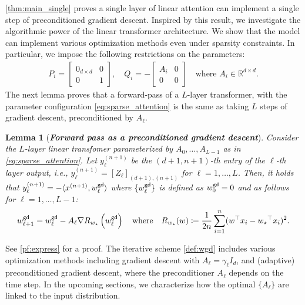 \documentclass{article}
\newcommand{\R}{\mathbb{R}}
\newtheorem{lemma}{Lemma}
\newcommand{\wstar}{w_\star}
\newcommand{\tx}[1]{x^{(#1)}}
\newcommand{\ty}[1]{y^{(#1)}}
\newcommand{\emphh}[1]{\textbf{\emph{#1}}}
\newcommand{\wgd}{w^{\sf gd}}
\newcommand*\lrp[1]{\left( #1 \right)}
\begin{document}
\autoref{thm:main_single} proves a single layer of linear attention can implement a single step of preconditioned gradient descent. Inspired by this result, we investigate the algorithmic power of the linear transformer architecture. We show that the model can implement various optimization methods even under sparsity constraints. In particular, we impose the following restrictions on the parameters:
\begin{align}\label{eq:sparse_attention}
P_i = \begin{bmatrix}
0_{d\times d} & 0 \\ 
0 & 1 
\end{bmatrix}, \quad Q_i = -  \begin{bmatrix}
A_i & 0 \\ 
0 & 0
\end{bmatrix} \quad \text{where $A_i \in \R^{d\times d}$.}
\end{align}
The next lemma proves that a forward-pass of a $L$-layer transformer, with the parameter configuration \eqref{eq:sparse_attention} is the same as taking $L$ steps of gradient descent, preconditioned by $A_\ell$.

  

\begin{lemma}[\emphh{Forward pass as a preconditioned gradient descent}] 
\label{lem:express}
Consider the $L$-layer linear transfomer parameterized by $A_0,\dots,A_{L-1}$ as in \eqref{eq:sparse_attention}.  
Let $\ty{n+1}_\ell$ be the $(d+1,n+1)$-th entry of the $\ell$-th layer output, i.e., $\ty{n+1}_\ell = [Z_{\ell}]_{(d+1),(n+1)}$ for $\ell=1,\dots, L$.
Then, it holds that $\ty{n+1}_\ell = - \langle\tx{n+1}, \wgd_\ell \rangle$ where $\{\wgd_\ell\}$ is defined as $\wgd_0=0$ and as follows for $\ell=1,\dots, L-1$:
\begin{align} \label{def:wgd}
\wgd_{\ell+1} = \wgd_{\ell} - A_\ell \nabla R_{\wstar}\lrp{\wgd_{\ell}}\quad \text{where} \quad R_{\wstar}(w) \coloneqq \frac{1}{2n}\sum_{i=1}^{n}(w^\top x_{i}- {\wstar}^\top x_{i})^2.
\end{align} 
\end{lemma}

See \autoref{pf:express} for a proof. The iterative scheme \eqref{def:wgd} includes various optimization methods including  gradient descent with $A_\ell = \gamma_\ell I_d$, and (adaptive) preconditioned gradient descent, where the preconditioner $A_\ell$ depends on the time step. In the upcoming sections, we characterize how the optimal $\{A_\ell\}$ are linked to the input distribution.
\end{document}
